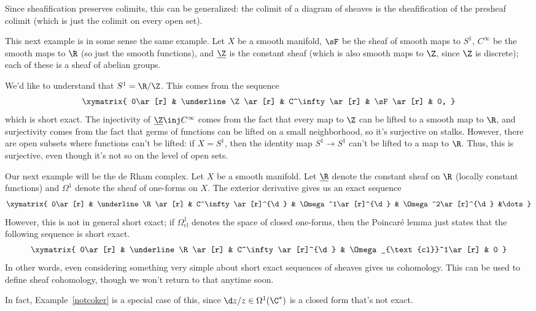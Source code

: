 Since sheafification preserves colimits, this can be generalized: the colimit of a diagram of sheaves is the
sheafification of the presheaf colimit (which is just the colimit on every open set).
\begin{exm}
This next example is in some sense the same example. Let \(X\) be a smooth manifold, \(\sF\) be the sheaf of
smooth maps to \(S^1\), \(C^\infty\) be the smooth maps to \(\R\) (so just the smooth functions), and
\(\underline\Z\) is the constant sheaf (which is also smooth maps to \(\Z\), since \(\Z\) is discrete); each of
these is a sheaf of abelian groups.

We'd like to understand that \(S^1 = \R/\Z\). This comes from the sequence
\[\xymatrix{
	0\ar[r] & \underline\Z\ar[r] & C^\infty\ar[r] & \sF\ar[r] & 0,
}\]
which is short exact. The injectivity of \(\underline\Z\inj C^\infty\) comes from the fact that every map to \(\Z\)
can be lifted to a smooth map to \(\R\), and surjectivity comes from the fact that germs of functions can be
lifted on a small neighborhood, so it's surjective on stalks. However, there are open subsets where functions can't
be lifted: if \(X = S^1\), then the identity map \(S^1\to S^1\) can't be lifted to a map to \(\R\). Thus, this is
surjective, even though it's not so on the level of open sets.
\end{exm}
\begin{exm}
Our next example will be the de Rham complex. Let \(X\) be a smooth manifold. Let \(\underline\R\) denote the
constant sheaf on \(\R\) (locally constant functions) and \(\Omega^1\) denote the sheaf of one-forms on \(X\). The
exterior derivative gives us an exact sequence
\[\xymatrix{
	0\ar[r] & \underline\R\ar[r] & C^\infty\ar[r]^{\d} & \Omega^1\ar[r]^{\d} & \Omega^2\ar[r]^{\d} &\dots
}\]
However, this is not in general short exact; if \(\Omega_{\text{cl}}^1\) denotes the space of closed one-forms,
then the Poincaré lemma just states that the following sequence is short exact.
\[\xymatrix{
	0\ar[r] & \underline\R\ar[r] & C^\infty\ar[r]^{\d} & \Omega_{\text{cl}}^1\ar[r] & 0
}\]
In other words, even considering something very simple about short exact sequences of sheaves gives us cohomology.
This can be used to define sheaf cohomology, though we won't return to that anytime soon.

In fact, Example~\ref{notcoker} is a special case of this, since \(\d z/z\in\Omega^1(\C^*)\) is a closed form
that's not exact.
\end{exm}

